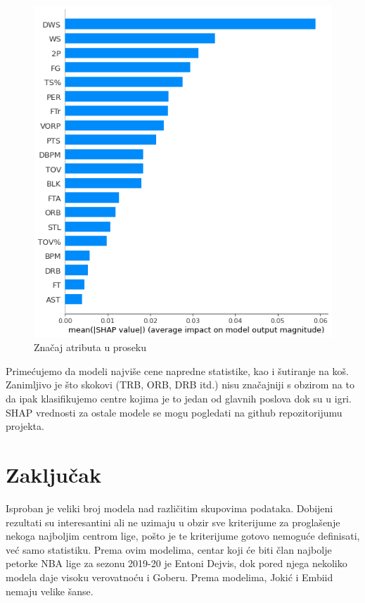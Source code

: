\documentclass[a4paper]{article}
\begin{document}
\begin{figure}[h!]
\begin{center}
\includegraphics[scale=0.4]{shap_simple_2.png}
\end{center}
\caption{Značaj atributa u proseku}
\label{plt:shap_simple_2}
\end{figure}

Primećujemo da modeli najviše cene napredne statistike, kao i šutiranje na koš. Zanimljivo je što skokovi (TRB, ORB, DRB itd.) nisu značajniji s obzirom na to da ipak klasifikujemo centre kojima je to jedan od glavnih poslova dok su u igri. SHAP vrednosti za ostale modele se mogu pogledati na github repozitorijumu projekta.

\section{Zaključak}
\label{sec:zakljucak}

Isproban je veliki broj modela nad različitim skupovima podataka. Dobijeni rezultati su interesantini ali ne uzimaju u obzir sve kriterijume za proglašenje nekoga najboljim centrom lige, pošto je te kriterijume gotovo nemoguće definisati, već samo statistiku. Prema ovim modelima, centar koji će biti član najbolje petorke NBA lige za sezonu 2019-20 je Entoni Dejvis, dok pored njega nekoliko modela daje visoku verovatnoću i Goberu. Prema modelima, Jokić i Embiid nemaju velike šanse.

\pagebreak

\appendix


\appendix
\end{document}
